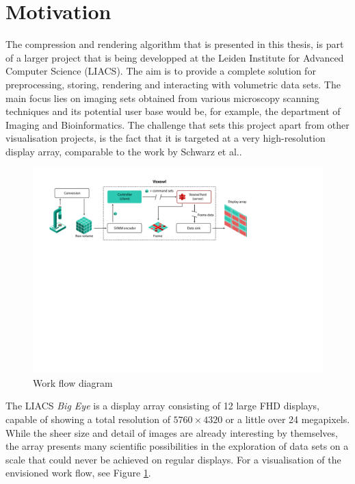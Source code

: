\section{Motivation} \label{ch:inducement}
%
The compression and rendering algorithm that is presented in this thesis, is part of a larger project that is being developped at the Leiden Institute for Advanced Computer Science (LIACS). The aim is to provide a complete solution for preprocessing, storing, rendering and interacting with volumetric data sets. The main focus lies on imaging sets obtained from various microscopy scanning techniques and its potential user base would be, for example, the department of Imaging and Bioinformatics. The challenge that sets this project apart from other visualisation projects, is the fact that it is targeted at a very high-resolution display array, comparable to the work by Schwarz et al.\cite{schwarz10}. 
%
\begin{figure}[H]
\includegraphics[scale=0.8]{figures/voxowl.pdf} 
\caption{Work flow diagram}
\label{fig:voxowl}
\end{figure}
\clearpage
%
The LIACS \emph{Big Eye} is a display array consisting of 12 large FHD displays, capable of showing a total resolution of $5760 \times 4320$ or a little over 24 megapixels. While the sheer size and detail of images are already interesting by themselves, the array presents many scientific possibilities in the exploration of data sets on a scale that could never be achieved on regular displays. For a visualisation of the envisioned work flow, see Figure \ref{fig:voxowl}.
%
